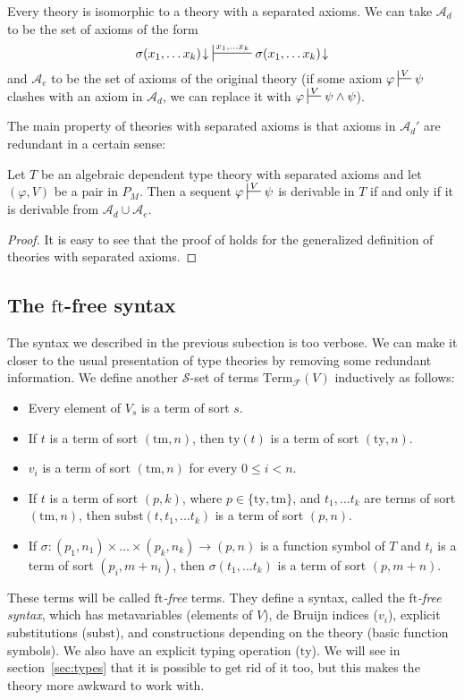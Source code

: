 \documentclass[reqno]{amsart}
\theoremstyle{definition}
\theoremstyle{remark}
\newcommand{\fs}[1]{\mathrm{#1}}
\newcommand{\Term}{\fs{Term}}
\newcommand{\subst}{\fs{subst}}
\newcommand{\ft}{\fs{ft}}
\newcommand{\ty}{\fs{ty}}
\newcommand{\tm}{\fs{tm}}
\numberwithin{figure}{section}
\begin{document}
\begin{remark}
Every theory is isomorphic to a theory with a separated axioms.
We can take $\mathcal{A}_d$ to be the set of axioms of the form
\[ \sigma(x_1, \ldots x_k)\!\downarrow\ \sststile{}{x_1, \ldots x_k} \sigma(x_1, \ldots x_k)\!\downarrow \]
and $\mathcal{A}_e$ to be the set of axioms of the original theory (if some axiom $\varphi \sststile{}{V} \psi$ clashes with an axiom in $\mathcal{A}_d$, we can replace it with $\varphi \sststile{}{V} \psi \land \psi$).
\end{remark}

The main property of theories with separated axioms is that axioms in $\mathcal{A}_d'$ are redundant in a certain sense:

\begin{prop}
Let $T$ be an algebraic dependent type theory with separated axioms and let $(\varphi,V)$ be a pair in $P_M$.
Then a sequent $\varphi \sststile{}{V} \psi$ is derivable in $T$ if and only if it is derivable from $\mathcal{A}_d \cup \mathcal{A}_e$.
\end{prop}
\begin{proof}
It is easy to see that the proof of \cite[Proposition~5.3]{morita-equiv} holds for the generalized definition of theories with separated axioms.
\end{proof}

\subsection{The $\ft$-free syntax}
\label{sec:contexts}

The syntax we described in the previous subection is too verbose.
We can make it closer to the usual presentation of type theories by removing some redundant information.
We define another $\mathcal{S}$-set of terms $\Term_\mathcal{F}(V)$ inductively as follows:
\begin{itemize}
\item Every element of $V_s$ is a term of sort $s$.
\item If $t$ is a term of sort $(\tm,n)$, then $\ty(t)$ is a term of sort $(\ty,n)$.
\item $v_i$ is a term of sort $(\tm,n)$ for every $0 \leq i < n$.
\item If $t$ is a term of sort $(p,k)$, where $p \in \{ \ty, \tm \}$, and $t_1, \ldots t_k$ are terms of sort $(\tm,n)$, then $\subst(t, t_1, \ldots t_k)$ is a term of sort $(p,n)$.
\item If $\sigma : (p_1,n_1) \times \ldots \times (p_k,n_k) \to (p,n)$ is a function symbol of $T$ and $t_i$ is a term of sort $(p_i,m+n_i)$, then $\sigma(t_1, \ldots t_k)$ is a term of sort $(p,m+n)$.
\end{itemize}
These terms will be called \emph{$\ft$-free} terms.
They define a syntax, called the \emph{$\ft$-free syntax}, which has metavariables (elements of $V$), de Bruijn indices ($v_i$), explicit substitutions ($\subst$), and constructions depending on the theory (basic function symbols).
We also have an explicit typing operation ($\ty$).
We will see in section~\ref{sec:types} that it is possible to get rid of it too, but this makes the theory more awkward to work with.
\end{document}

